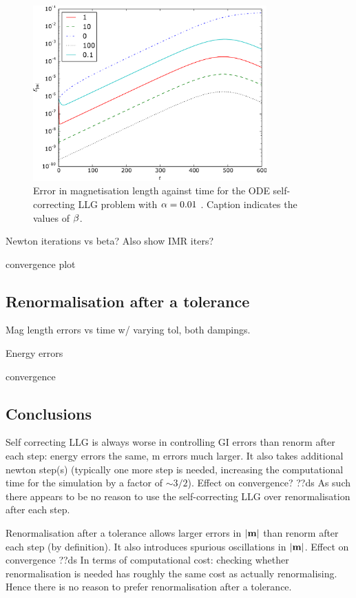 \begin{figure}
  \centering
  \includegraphics[width=0.8\textwidth]{plots//self_correcting_ode/001-mlengtherrormaxesvstimes.pdf}
  \caption{
    Error in magnetisation length against time for the ODE self-correcting LLG problem with
    $\alpha = 0.01$
    . Caption indicates the values of $\beta$.
  }
\end{figure}


Newton iterations vs beta? Also show IMR iters?

convergence plot


\subsection{Renormalisation after a tolerance}
\label{sec:renorm-after-toler}

Mag length errors vs time w/ varying tol, both dampings.

Energy errors

convergence

\subsection{Conclusions}

Self correcting LLG is always worse in controlling GI errors than renorm after each step: energy errors the same, m errors much larger.
It also takes additional newton step(s) (typically one more step is needed, increasing the computational time for the simulation by a factor of $\sim 3/2$).
Effect on convergence? ??ds
As such there appears to be no reason to use the self-correcting LLG over renormalisation after each step.


Renormalisation after a tolerance allows larger errors in $\left|{\boldsymbol{\mathrm{m}}} \right|$ than renorm after each step (by definition).
It also introduces spurious oscillations in $\left|{\boldsymbol{\mathrm{m}}} \right|$.
Effect on convergence ??ds
In terms of computational cost: checking whether renormalisation is needed has roughly the same cost as actually renormalising.
Hence there is no reason to prefer renormalisation after a tolerance.

